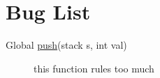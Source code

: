 \hypertarget{bug}{}\section{Bug List}\label{bug}
\label{_bug000001}
\hypertarget{bug__bug000001}{}
\begin{description}
\item[Global \hyperlink{stack_8h_a3}{push}(stack s, int val) ]
this function rules too much\end{description}
 